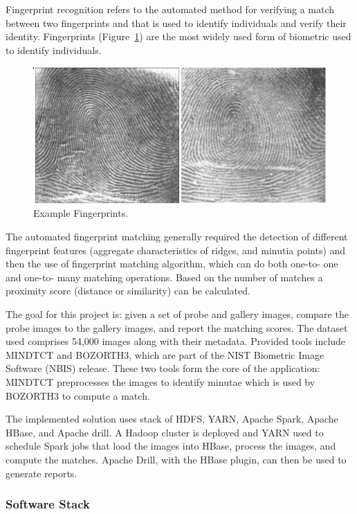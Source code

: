 \documentclass[9pt,twocolumn,twoside]{styles/osajnl}
\begin{document}
Fingerprint recognition refers to the automated method for verifying a
match between two fingerprints and that is used to identify
individuals and verify their identity. Fingerprints
(Figure~\ref{F:NIST-fingerprints}) are the most widely used form of
biometric used to identify individuals.



\begin{figure}[htb]
  \centering
      \includegraphics[width=0.9\columnwidth]{images/fingerprints}
  \caption{Example Fingerprints.}
  \label{F:NIST-fingerprints}
\end{figure}



The automated fingerprint matching generally required the detection of
different fingerprint features (aggregate characteristics of ridges,
and minutia points) and then the use of fingerprint matching
algorithm, which can do both one-to- one and one-to- many matching
operations. Based on the number of matches a proximity score (distance
or similarity) can be calculated.


The goal for this project is: given a set of probe and gallery images,
compare the probe images to the gallery images, and report the
matching scores.  The dataset used comprises 54,000 images along with
their metadata. Provided tools include MINDTCT and BOZORTH3, which are
part of the NIST Biometric Image Software (NBIS) release. These two
tools form the core of the application: MINDTCT preprocesses the
images to identify minutae which is used by BOZORTH3 to compute a
match.


The implemented solution uses stack of HDFS, YARN, Apache Spark,
Apache HBase, and Apache drill. A Hadoop cluster is deployed and YARN
used to schedule Spark jobs that load the images into HBase, process
the images, and compute the matches. Apache Drill, with the HBase
plugin, can then be used to generate reports.

\subsubsection{Software Stack}
\end{document}

